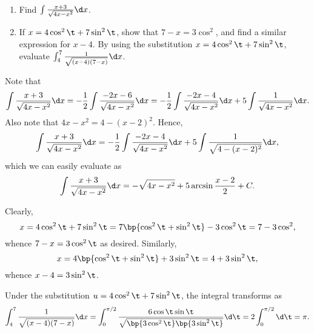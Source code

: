\clearpage
\begin{problem}
    \begin{enumerate}
        \item Find $\int \frac{x + 3}{\sqrt{4x - x^2}} \d x$.
        \item If $x = 4\cos^2 \t + 7\sin^2\t$, show that $7-x = 3\cos^2$, and find a similar expression for $x - 4$. By using the substitution $x = 4\cos^2 \t + 7\sin^2 \t$, evaluate $\int_4^7 \frac1{\sqrt{(x-4)(7-x)}} \d x$.
    \end{enumerate}
\end{problem}
\begin{solution}
    \begin{ppart}
        Note that \[\int \frac{x + 3}{\sqrt{4x - x^2}} \d x = -\frac12 \int \frac{-2x - 6}{\sqrt{4x - x^2}} \d x = -\frac12 \int \frac{-2x - 4}{\sqrt{4x - x^2}} \d x + 5 \int \frac{1}{\sqrt{4x - x^2}} \d x.\] Also note that $4x - x^2 = 4-(x-2)^2$. Hence, \[\int \frac{x + 3}{\sqrt{4x - x^2}} \d x = -\frac12 \int \frac{-2x - 4}{\sqrt{4x - x^2}} \d x + 5 \int \frac{1}{\sqrt{4-(x-2)^2}} \d x,\] which we can easily evaluate as \[\int \frac{x + 3}{\sqrt{4x - x^2}} \d x = -\sqrt{4x - x^2} + 5\arcsin \frac{x-2}{2} + C.\]
    \end{ppart}
    \begin{ppart}
        Clearly, \[x = 4\cos^2 \t + 7\sin^2 \t = 7\bp{\cos^2 \t + \sin^2 \t} - 3\cos^2 \t = 7 - 3\cos^2,\] whence $7-x = 3\cos^2 \t$ as desired. Similarly, \[x = 4\bp{\cos^2 \t + \sin^2 \t} + 3\sin^2 \t = 4 + 3\sin^2 \t,\] whence $x-4 = 3\sin^2 \t$.

        Under the substitution $u = 4\cos^2 \t + 7\sin^2 \t$, the integral transforms as \[\int_4^7 \frac1{\sqrt{(x-4)(7-x)}} \d x = \int_{0}^{\pi/2} \frac{6\cos \t \sin \t}{\sqrt{\bp{3\cos^2 \t}\bp{3\sin^2 \t}}} \d \t = 2 \int_0^{\pi/2} \d \t = \pi.\]
    \end{ppart}
\end{solution}

